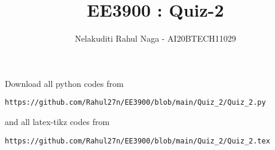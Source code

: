 \documentclass[journal,12pt,twocolumn]{IEEEtran}
\DeclareMathOperator*{\Res}{Res}
\begin{document}
\newcommand{\BEQA}{\begin{eqnarray}}
\newcommand{\EEQA}{\end{eqnarray}}
\newcommand{\define}{\stackrel{\triangle}{=}}

\raggedbottom
\setlength{\parindent}{0pt}
\providecommand{\mbf}{\mathbf}
\providecommand{\pr}[1]{\ensuremath{\Pr\left(#1\right)}}
\providecommand{\qfunc}[1]{\ensuremath{Q\left(#1\right)}}
\providecommand{\sbrak}[1]{\ensuremath{{}\left[#1\right]}}
\providecommand{\lsbrak}[1]{\ensuremath{{}\left[#1\right.}}
\providecommand{\rsbrak}[1]{\ensuremath{{}\left.#1\right]}}
\providecommand{\brak}[1]{\ensuremath{\left(#1\right)}}
\providecommand{\lbrak}[1]{\ensuremath{\left(#1\right.}}
\providecommand{\rbrak}[1]{\ensuremath{\left.#1\right)}}
\providecommand{\cbrak}[1]{\ensuremath{\left\{#1\right\}}}
\providecommand{\lcbrak}[1]{\ensuremath{\left\{#1\right.}}
\providecommand{\rcbrak}[1]{\ensuremath{\left.#1\right\}}}
\theoremstyle{remark}
\newtheorem{rem}{Remark}
\newcommand{\sgn}{\mathop{\mathrm{sgn}}}
\providecommand{\abs}[1]{\vert#1\vert}
\providecommand{\res}[1]{\Res\displaylimits_{#1}} 
\providecommand{\norm}[1]{\lVert#1\rVert}
\providecommand{\mtx}[1]{\mathbf{#1}}
\providecommand{\mean}[1]{E[ #1 ]}
\providecommand{\fourier}{\overset{\mathcal{F}}{ \rightleftharpoons}}
\providecommand{\system}{\overset{\mathcal{H}}{ \longleftrightarrow}}
\newcommand{\solution}{\noindent \textbf{Solution: }}
\newcommand{\cosec}{\,\text{cosec}\,}
\providecommand{\dec}[2]{\ensuremath{\overset{#1}{\underset{#2}{\gtrless}}}}
\newcommand{\myvec}[1]{\ensuremath{\begin{pmatrix}#1\end{pmatrix}}}
\newcommand{\mydet}[1]{\ensuremath{\begin{vmatrix}#1\end{vmatrix}}}
\makeatletter
{}
\makeatother
\let\StandardTheFigure\thefigure
\let\vec\mathbf
\renewcommand{\thefigure}{\theproblem}
\def\putbox#1#2#3{\makebox[0in][l]{\makebox[#1][l]{}\raisebox{\baselineskip}[0in][0in]{\raisebox{#2}[0in][0in]{#3}}}}
     \def\rightbox#1{\makebox[0in][r]{#1}}
     \def\centbox#1{\makebox[0in]{#1}}
     \def\topbox#1{\raisebox{-\baselineskip}[0in][0in]{#1}}
     \def\midbox#1{\raisebox{-0.5\baselineskip}[0in][0in]{#1}}
\vspace{3cm}
\title{ EE3900 : Quiz-2}
\author{Nelakuditi Rahul Naga - AI20BTECH11029}
\maketitle
\newpage
\bigskip
\renewcommand{\thefigure}{\theenumi}
\renewcommand{\thetable}{\theenumi}
Download all python codes from 
\begin{lstlisting}
https://github.com/Rahul27n/EE3900/blob/main/Quiz_2/Quiz_2.py
\end{lstlisting}
%
and all latex-tikz codes from 
%
\begin{lstlisting}
https://github.com/Rahul27n/EE3900/blob/main/Quiz_2/Quiz_2.tex
\end{lstlisting}
\vspace{0.5cm}
\end{document}
